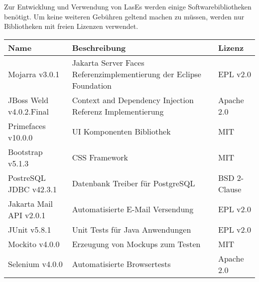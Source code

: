 
Zur Entwicklung und Verwendung von LasEs werden einige Softwarebibliotheken benötigt. Um keine weiteren Gebühren geltend machen zu müssen, werden nur Bibliotheken mit freien Lizenzen verwendet.

\begin{table}[H]
	\centering
	\begin{tabularx}{\columnwidth}{|l|X|l|}
		\hline
		Name & Beschreibung & Lizenz \\
		\hline\hline
		Mojarra v3.0.1 & Jakarta Server Faces Referenzimplementierung der Eclipse Foundation & EPL v2.0 \\
		\hline
		JBoss Weld v4.0.2.Final & Context and Dependency Injection Referenz Implementierung & Apache 2.0 \\
		\hline
		Primefaces v10.0.0 & UI Komponenten Bibliothek & MIT \\
		\hline
		Bootstrap v5.1.3 & CSS Framework & MIT \\
		\hline
		PostreSQL JDBC v42.3.1 & Datenbank Treiber für PostgreSQL & BSD 2-Clause \\
		\hline
		Jakarta Mail API v2.0.1 & Automatisierte E-Mail Versendung & EPL v2.0 \\
		\hline
		JUnit v5.8.1 & Unit Tests für Java Anwendungen & EPL v2.0 \\
		\hline
		Mockito v4.0.0 & Erzeugung von Mockups zum Testen & MIT \\
		\hline
		Selenium v4.0.0 & Automatisierte Browsertests & Apache 2.0 \\
		\hline



	\end{tabularx}
\end{table}